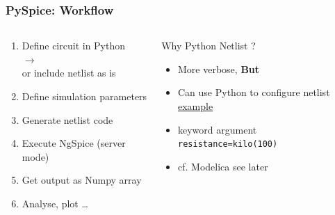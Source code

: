 \begin{frame}
  \frametitle{PySpice: Workflow}
  \begin{center}
  \end{center}
  \vspace{.5em}
  \begin{columns}[T]
    \begin{column}{.55\textwidth}
      \begin{enumerate}
      \item Define circuit in Python \\
        {
          \footnotesize
          $\longrightarrow$
           \\[.5em]
        }
        or include netlist as is
      \item Define simulation parameters \\
      \item Generate netlist code \\
      \item Execute NgSpice {\tiny (server mode)} \\
      \item Get output as Numpy array
      \item Analyse, plot \ldots
      \end{enumerate}
    \end{column}
    \begin{column}{.45\textwidth}
      Why Python Netlist ?
      \begin{itemize}
      \item More verbose, \textbf{But}
      \item Can use Python to configure netlist
        \href{https://pyspice.fabrice-salvaire.fr/examples/diode/voltage-multiplier.html}{example}
      \item keyword argument \\
        \texttt{resistance=kilo(100)} \\[.5em]
      \item cf. Modelica \tiny{see later}
      \end{itemize}
    \end{column}
  \end{columns}
\end{frame}

